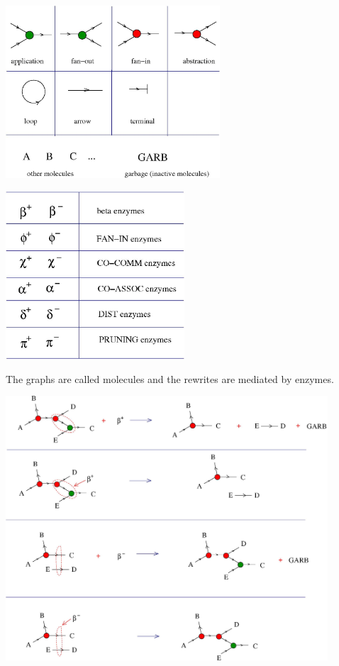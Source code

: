 \documentclass{article}
\begin{document}
\vspace{.5cm}
 
\centerline{\includegraphics[width=0.6\textwidth]{../img/chemical-concrete-machine/ess_101.jpg}
}
\centerline{\includegraphics[width=0.5\textwidth]{../img/chemical-concrete-machine/ess_102.jpg}
}
\vspace{.5cm}
The graphs are called molecules and the rewrites are mediated by enzymes.



\vspace{.5cm}
 
\centerline{\includegraphics[width=0.9\textwidth]{../img/chemical-concrete-machine/ess_3.jpg}
}
\vspace{.5cm}
\end{document}
